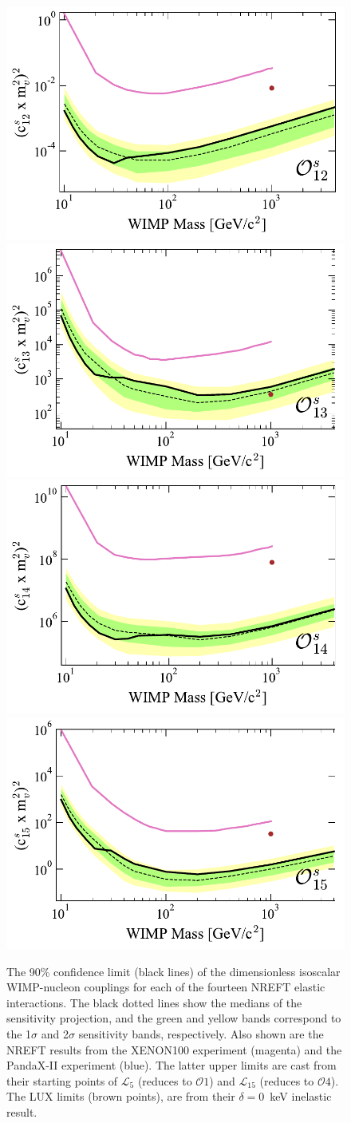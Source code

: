 \documentclass[reprint, showpacs,
preprintnumbers,
amsmath,amssymb,
aps, floatfix,
superscriptaddress,
prd, nofootinbib]{revtex4-1}
\begin{document}
\begin{figure}
    \includegraphics[width=0.5\columnwidth]{SR1_EFT_O12s_c2_lim_Comparison}
    \includegraphics[width=0.5\columnwidth]{SR1_EFT_O13s_c2_lim_Comparison}
    \includegraphics[width=0.5\columnwidth]{SR1_EFT_O14s_c2_lim_Comparison}
    \includegraphics[width=0.5\columnwidth]{SR1_EFT_O15s_c2_lim_Comparison}
    \caption{
    The 90\% confidence limit (black lines) of the dimensionless isoscalar WIMP-nucleon couplings for each of the fourteen NREFT elastic interactions.
    The black dotted lines show the medians of the sensitivity projection, and the green and yellow bands correspond to the 1$\sigma$ and 2$\sigma$ sensitivity bands, respectively.
    Also shown are the NREFT results from the XENON100 experiment (magenta) and the PandaX-II experiment (blue).
    The latter upper limits are cast from their starting points of $\mathcal{L}_5$ (reduces to $\mathcal{O}1$) and $\mathcal{L}_{15}$ (reduces to $\mathcal{O}4$).
    The LUX limits (brown points), are from their $\delta=0$~keV inelastic result.
    }
  \label{fig:limits-elastic-s}
\end{figure}
\end{document}
